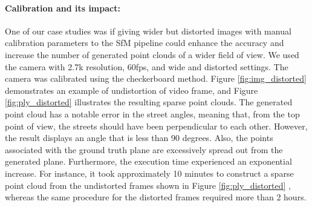 \documentclass[11pt]{article}
\begin{document}
    \paragraph{Calibration and its impact:}
    One of our case studies was if giving wider but distorted images with manual calibration parameters to the SfM pipeline
    could enhance the accuracy and increase the number of generated point clouds of a wider field of view. We used
    the camera with 2.7k resolution, 60fps, and wide and distorted settings. The camera was calibrated using the
    checkerboard method. Figure \ref{fig:img_distorted} demonstrates an example of undistortion of video frame,
    and Figure \ref{fig:ply_distorted} illustrates the resulting sparse point clouds.
    The generated point cloud has a notable error in the street angles, meaning that, from the top point of view, the
    streets should have been perpendicular to each other. However, the result displays an angle that is less than 90 degrees.
    Also, the points associated with the ground truth plane are excessively spread out from the generated plane.
    Furthermore, the execution time experienced an exponential increase. For instance, it took approximately
    10 minutes to construct a sparse point cloud from the undistorted frames shown in Figure \ref{fig:ply_distorted}
    , whereas the same procedure for the distorted frames required more than 2 hours.
\end{document}
